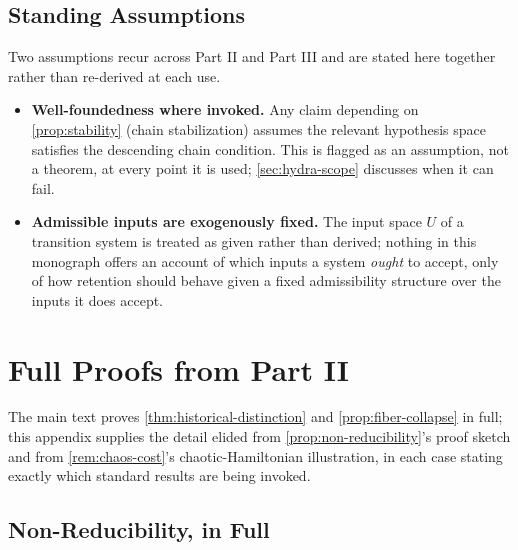 \documentclass[11pt]{book}
\theoremstyle{plain}
\theoremstyle{definition}
\theoremstyle{remark}
\begin{document}
\section{Standing Assumptions}

Two assumptions recur across Part II and Part III and are stated here
together rather than re-derived at each use.

\begin{itemize}
\item \textbf{Well-foundedness where invoked.} Any claim depending on
\cref{prop:stability} (chain stabilization) assumes the relevant
hypothesis space satisfies the descending chain condition. This is
flagged as an assumption, not a theorem, at every point it is used;
\cref{sec:hydra-scope} discusses when it can fail.
\item \textbf{Admissible inputs are exogenously fixed.} The input
space $U$ of a transition system is treated as given rather than
derived; nothing in this monograph offers an account of which inputs
a system \emph{ought} to accept, only of how retention should behave
given a fixed admissibility structure over the inputs it does accept.
\end{itemize}
\chapter{Full Proofs from Part II}
\label{app:proofs-part-ii}

The main text proves \cref{thm:historical-distinction} and
\cref{prop:fiber-collapse} in full; this appendix supplies the detail
elided from \cref{prop:non-reducibility}'s proof sketch and from
\cref{rem:chaos-cost}'s chaotic-Hamiltonian illustration, in each case
stating exactly which standard results are being invoked.

\section{Non-Reducibility, in Full}
\end{document}
